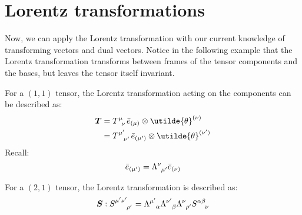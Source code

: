 \documentclass[11pt]{article}
\begin{document}
	\section{Lorentz transformations}\label{sec:lorentz}
	Now, we can apply the Lorentz transformation with our current knowledge of transforming vectors and dual vectors. Notice in the following example that the Lorentz transformation transforms between frames of the tensor components and the bases, but leaves the tensor itself invariant.
	\begin{example}
	For a $(1,1)$ tensor, the Lorentz transformation acting on the components can be described as:
	\begin{equation}
	\begin{aligned}
	\boldsymbol{T} &= \tensor{T}{^\mu_\nu} \bar{e}_{(\mu)} \otimes \utilde{\theta}^{(\nu)}\\
	&= \tensor{T}{^{\mu'}_{\nu'}} \bar{e}_{(\mu')} \otimes \utilde{\theta}^{(\nu')}\\
	\label{eq:lorentz1}
	\end{aligned}
	\end{equation}
	Recall:\\
	\begin{equation}
	\bar{e}_{(\mu')} = \tensor{\Lambda}{^\nu_{\mu'}} \bar{e}_{(\nu)}
	\label{eq:lorentz2}
	\end{equation}
	
	For a $(2,1)$ tensor, the Lorentz transformation is described as:
	\begin{equation}
	\boldsymbol{S} : \tensor{S}{^{\mu'}^{\nu'}_{\rho'}} = \tensor{\Lambda}{^{\mu'}_{\alpha}} \tensor{\Lambda}{^{\nu'}_{\beta}} \tensor{\Lambda}{^{\nu}_{\rho'}} \tensor{S}{^{\alpha}^{\beta}_{\nu}}
	\label{eq:lorentz3}
	\end{equation}
	\end{example}
	
	
\end{document}

